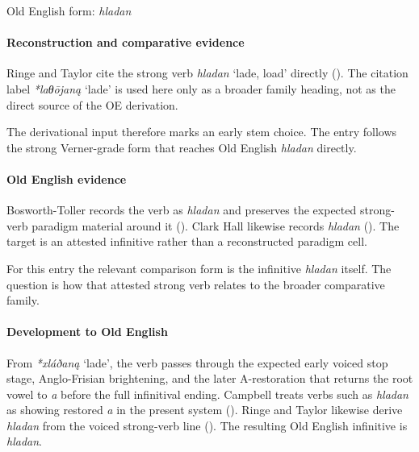 \documentclass[
  british,
  a4paper,
]{article}
\providecommand{\Recon}[1]{\emph{*#1}}
\begin{document}
Old English form: \emph{hladan}

\paragraph{Reconstruction and comparative
evidence}\label{reconstruction-and-comparative-evidence-100}

Ringe and Taylor cite the strong verb {\emph{hladan}} `lade, load'
directly ().
The citation label \Recon{laθōjaną} `lade' is used here only as a
broader family heading, not as the direct source of the OE derivation.

The derivational input therefore marks an early stem choice. The entry
follows the strong Verner-grade form that reaches Old English
\emph{hladan} directly.

\paragraph{Old English evidence}\label{old-english-evidence-102}

Bosworth-Toller records the verb as \emph{hladan} and preserves the
expected strong-verb paradigm material around it
().
Clark Hall likewise records \emph{hladan}
(). The target is an
attested infinitive rather than a reconstructed paradigm cell.

For this entry the relevant comparison form is the infinitive
\emph{hladan} itself. The question is how that attested strong verb
relates to the broader comparative family.

\paragraph{Development to Old
English}\label{development-to-old-english-100}

From \Recon{xláðaną} `lade', the verb passes through the expected early
voiced stop stage, Anglo-Frisian brightening, and the later
A-restoration that returns the root vowel to \emph{a} before the full
infinitival ending. Campbell treats verbs such as \emph{hladan} as
showing restored \emph{a} in the present system
(). Ringe and
Taylor likewise derive \emph{hladan} from the voiced strong-verb line
(). The
resulting Old English infinitive is \emph{hladan}.
\end{document}

